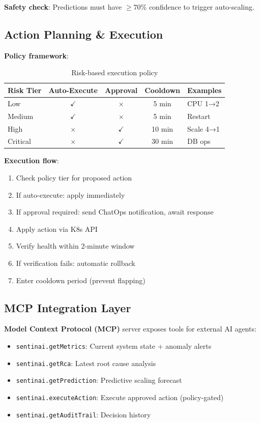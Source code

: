 \documentclass[11pt,a4paper]{article}
\begin{document}
\textbf{Safety check}: Predictions must have $\geq$70\% confidence to trigger auto-scaling.

\subsection{Action Planning \& Execution}

\textbf{Policy framework}:

\begin{table}[h]
\centering
\begin{tabular}{@{}lcccp{3cm}@{}}
\toprule
\textbf{Risk Tier} & \textbf{Auto-Execute} & \textbf{Approval} & \textbf{Cooldown} & \textbf{Examples} \\ \midrule
Low       & $\checkmark$ & $\times$ & 5 min  & CPU 1→2 \\
Medium    & $\checkmark$ & $\times$ & 5 min  & Restart \\
High      & $\times$ & $\checkmark$ & 10 min & Scale 4→1 \\
Critical  & $\times$ & $\checkmark$ & 30 min & DB ops \\ \bottomrule
\end{tabular}
\caption{Risk-based execution policy}
\end{table}

\textbf{Execution flow}:
\begin{enumerate}
    \item Check policy tier for proposed action
    \item If auto-execute: apply immediately
    \item If approval required: send ChatOps notification, await response
    \item Apply action via K8s API
    \item Verify health within 2-minute window
    \item If verification fails: automatic rollback
    \item Enter cooldown period (prevent flapping)
\end{enumerate}

\subsection{MCP Integration Layer}

\textbf{Model Context Protocol (MCP)} server exposes tools for external AI agents:

\begin{itemize}
    \item \texttt{sentinai.getMetrics}: Current system state + anomaly alerts
    \item \texttt{sentinai.getRca}: Latest root cause analysis
    \item \texttt{sentinai.getPrediction}: Predictive scaling forecast
    \item \texttt{sentinai.executeAction}: Execute approved action (policy-gated)
    \item \texttt{sentinai.getAuditTrail}: Decision history
\end{itemize}
\end{document}
